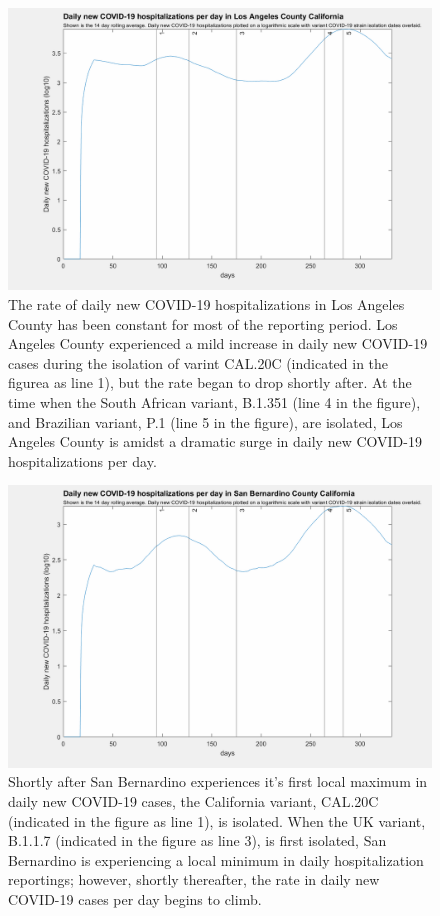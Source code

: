 \documentclass[]{article}
\begin{document}
\begin{figure}[!h]
	\includegraphics[width=\linewidth]{images/los_angeles_hospitalizations_strains_log.png}
	\caption{The rate of daily new COVID-19 hospitalizations in Los Angeles County has been constant for most of the reporting period. Los Angeles County experienced a mild increase in daily new COVID-19 cases during the isolation of varint CAL.20C (indicated in the figurea as line 1), but the rate began to drop shortly after. At the time when the South African variant, B.1.351 (line 4 in the figure), and Brazilian variant, P.1 (line 5 in the figure), are isolated, Los Angeles County is amidst a dramatic surge in daily new COVID-19 hospitalizations per day.}
	\label{fig:images/los_angeles_hospitalizations_strains_logLabel}
\end{figure}


\begin{figure}[!h]
	\includegraphics[width=\linewidth]{images/san_bernardino_hospitalizations_strains_log.png}
	\caption{Shortly after San Bernardino experiences it's first local maximum in daily new COVID-19 cases, the California variant, CAL.20C (indicated in the figure as line 1), is isolated. When the UK variant, B.1.1.7 (indicated in the figure as line 3), is first isolated, San Bernardino is experiencing a local minimum in daily hospitalization reportings; however, shortly thereafter, the rate in daily new COVID-19 cases per day begins to climb. }
	\label{fig:images/san_bernardino_hospitalizations_strains_logLabel}
\end{figure}
\end{document}
